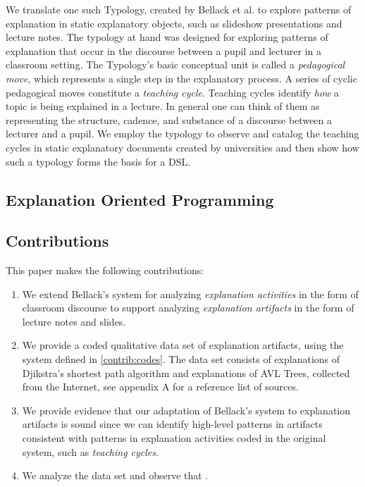 \documentclass[conference]{IEEEtran}
\begin{document}
We translate one such Typology, created by Bellack et
al.\cite{bellack1966language} to explore patterns of explanation in static
explanatory objects, such as slideshow presentations and lecture notes. The
typology at hand was designed for exploring patterns of explanation that occur
in the discourse between a pupil and lecturer in a classroom setting. The
Typology's basic conceptual unit is called a \emph{pedagogical move}, which
represents a single step in the explanatory process. A series of cyclic
pedagogical moves constitute a \emph{teaching cycle}. Teaching cycles identify
\emph{how} a topic is being explained in a lecture. In general one can think of
them as representing the structure, cadence, and substance of a discourse
between a lecturer and a pupil. We employ the typology to observe and catalog
the teaching cycles in static explanatory documents created by universities and
then show how such a typology forms the basis for a DSL.

\subsection{Explanation Oriented Programming}

\subsection{Contributions}
This paper makes the following contributions:
%
\begin{enumerate}[C1.]

\item \label{contrib:codes}
%
We extend Bellack's system for analyzing \emph{explanation activities} in the
form of classroom discourse to support analyzing \emph{explanation artifacts}
in the form of lecture notes and slides.

\item \label{contrib:data}
%
We provide a coded qualitative data set of explanation artifacts, using the
system defined in \ref{contrib:codes}. The data set consists of 
explanations of Djikstra's shortest path algorithm and  explanations
of AVL Trees, collected from the Internet, see appendix A for a reference list
of sources.

\item \label{contrib:valid}
%
We provide evidence that our adaptation of Bellack's system to explanation
artifacts is sound since we can identify high-level patterns in artifacts
consistent with patterns in explanation activities coded in the original
system, such as \emph{teaching cycles}.

\item \label{contrib:valid}
%
We analyze the data set and observe that .

\end{enumerate}
\end{document}

